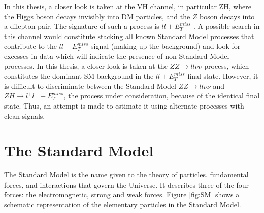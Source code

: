 \documentclass[11pt,a4paper,openright,twoside]{report}
\newcommand{\ZZ}{$ZZ\to ll\nu\nu$ }
\newcommand{\llM}{$ll+E_T^{miss}$ }
\begin{document}
In this thesis, a closer look is taken at the VH channel, in particular ZH, where the Higgs boson decays invisibly into DM particles, and the $Z$ boson decays into a dilepton pair. The signature of such a process is \llM. A possible search in this channel would constitute stacking all known Standard Model processes that contribute to the \llM signal (making up the background) and look for excesses in data which will indicate the presence of non-Standard-Model processes. In this thesis, a closer look is taken at the \ZZ process, which constitutes the dominant SM background in the \llM final state. However, it is difficult to discriminate between the Standard Model \ZZ and $ZH\to l^+l^-+E_T^{miss}$, the process under consideration, because of the identical final state. Thus, an attempt is made to estimate it using alternate processes with clean signals.

\section{The Standard Model}
The Standard Model is the name given to the theory of particles, fundamental forces, and interactions that govern the Universe. It describes three of the four forces: the electromagnetic, strong and weak forces. Figure \ref{fig:SM} shows a schematic representation of the elementary particles in the Standard Model.
\end{document}
